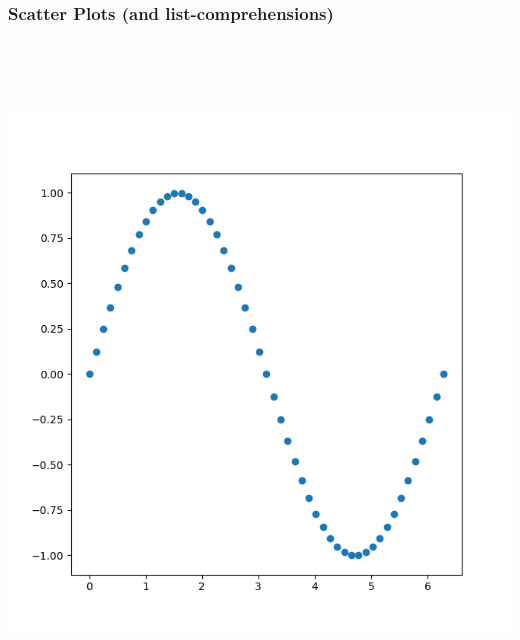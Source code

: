 \documentclass{beamer}
\begin{document}



\begin{frame}[fragile]
  \frametitle{Scatter Plots (and list-comprehensions)}
  \inputminted[firstline=1,lastline=1]{python}{code/scatter.txt}
  \codepause
  \inputminted[firstline=2,lastline=2]{python}{code/scatter.txt}
  \codepause
  \inputminted[firstline=3,lastline=3]{python}{code/scatter.txt}
  \codepause
  \inputminted[firstline=4,lastline=4]{python}{code/scatter.txt}
  \codepause
  \inputminted[firstline=5,lastline=5]{python}{code/scatter.txt}
\end{frame}

\begin{frame}
  \centerline{\includegraphics[scale=0.5]{image/scatter_sin.png}}
\end{frame}
\end{document}
